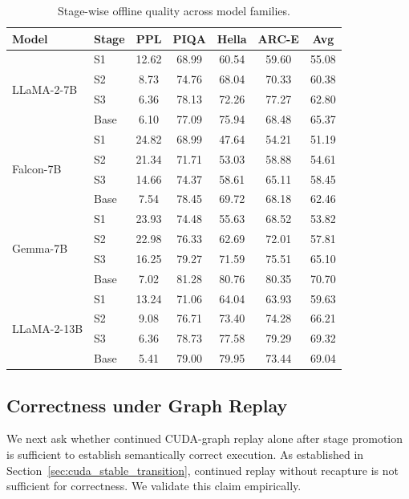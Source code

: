 \documentclass[sigplan,anonymous,review,nonacm]{acmart}
\begin{document}
\begin{table}[t]
\centering
\caption{Stage-wise offline quality across model families.}
\label{tab:main_offline_results}
\small
\setlength{\tabcolsep}{4pt}
\renewcommand{\arraystretch}{0.95}

\begin{tabular*}{\columnwidth}{@{\extracolsep{\fill}}llccccc}
\toprule
Model & Stage & PPL & PIQA & Hella & ARC-E & Avg \\
\midrule
\multirow{4}{*}{LLaMA-2-7B}
& S1   & 12.62 & 68.99 & 60.54 & 59.60 & 55.08 \\
& S2   &  8.73 & 74.76 & 68.04 & 70.33 & 60.38 \\
& S3   &  6.36 & 78.13 & 72.26 & 77.27 & 62.80 \\
& Base &  6.10 & 77.09 & 75.94 & 68.48 & 65.37 \\
\midrule
\multirow{4}{*}{Falcon-7B}
& S1   & 24.82 & 68.99 & 47.64 & 54.21 & 51.19 \\
& S2   & 21.34 & 71.71 & 53.03 & 58.88 & 54.61 \\
& S3   & 14.66 & 74.37 & 58.61 & 65.11 & 58.45 \\
& Base &  7.54 & 78.45 & 69.72 & 68.18 & 62.46 \\
\midrule
\multirow{4}{*}{Gemma-7B}
& S1   & 23.93 & 74.48 & 55.63 & 68.52 & 53.82 \\
& S2   & 22.98 & 76.33 & 62.69 & 72.01 & 57.81 \\
& S3   & 16.25 & 79.27 & 71.59 & 75.51 & 65.10 \\
& Base &  7.02 & 81.28 & 80.76 & 80.35 & 70.70 \\
\midrule
\multirow{4}{*}{LLaMA-2-13B}
& S1   & 13.24 & 71.06 & 64.04 & 63.93 & 59.63 \\
& S2   &  9.08 & 76.71 & 73.40 & 74.28 & 66.21 \\
& S3   &  6.36 & 78.73 & 77.58 & 79.29 & 69.32 \\
& Base &  5.41 & 79.00 & 79.95 & 73.44 & 69.04 \\
\bottomrule
\end{tabular*}
\end{table}
\subsection{Correctness under Graph Replay}
\label{sec:eval-graph-replay}

We next ask whether continued CUDA-graph replay alone after stage promotion is sufficient to establish semantically correct execution. As established in Section~\ref{sec:cuda_stable_transition}, continued replay without recapture is not sufficient for correctness. We validate this claim empirically.
\end{document}
